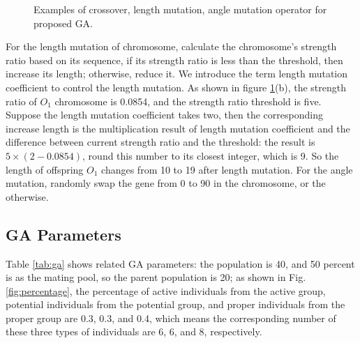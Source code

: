 \documentclass[10pt, journal]{IEEEtran}
\begin{document}
\begin{figure}[!b]
\begin{center}
{
}
\end{center}
\caption{Examples of crossover, length mutation, angle  mutation operator for proposed GA.}
\label{GA:operator}
\end{figure}

For the length mutation of chromosome, calculate the chromosome's strength ratio
based on its sequence, if its strength ratio is less than the threshold, then
increase its length; otherwise, reduce it. We introduce the term length
mutation coefficient to control the length mutation.  As shown in figure
\ref{GA:operator}(b), the strength ratio of $O_1$ chromosome is 0.0854, and the
strength ratio threshold is five. Suppose the length mutation coefficient takes
two, then the corresponding increase length is the multiplication result of
length mutation coefficient and the difference between current strength ratio
and the threshold: the result is $5\times(2-0.0854)$, round this number to its
closest integer, which is 9. So the length of offspring $O_1$ changes from 10
to 19 after length mutation.  For the angle mutation, randomly swap the gene
from 0 to 90 in the chromosome, or the otherwise.


\subsection{GA Parameters}
Table \ref{tab:ga} shows related GA parameters: the population is 40, and 50
percent is as the mating pool, so the parent population is 20; as
shown in Fig. \ref{fig:percentage}, the percentage of active individuals from
the active group, potential individuals from the potential group, and proper
individuals from the proper group are 0.3, 0.3, and 0.4, which means the
corresponding number of these three types of individuals are 6, 6, and 8,
respectively.
\end{document}
